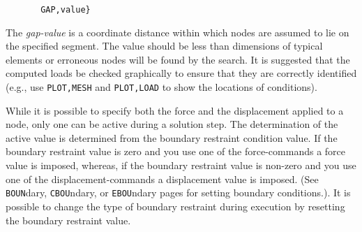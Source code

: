 \begin{verbatim}
       GAP,value}
\end{verbatim}
The {\it gap-value} is a coordinate distance within which
nodes are assumed to lie on the specified segment.  The
value should be less than dimensions of typical elements
or erroneous nodes will be found by the search.
It is suggested that the computed loads
be checked graphically to ensure that they are
correctly identified (e.g., use {\tt PLOT,MESH} and {\tt PLOT,LOAD}
to show the locations of conditions).

While it is possible to specify both the force and the displacement applied
to a node, only one can be active during a solution step.  The determination
of the active value is determined from the boundary
restraint condition value.  If the boundary restraint value is zero
and you use one of the force-commands a force
value is imposed, whereas, if the boundary restraint value is non-zero
and you use one of the displacement-commands a
displacement value is imposed. (See {\tt BOUN}dary, {\tt CBOU}ndary,
or {\tt EBOU}ndary pages for setting boundary
conditions.).  It is possible to change the type of boundary restraint
during execution by resetting the boundary restraint value.
\vfil\eject
